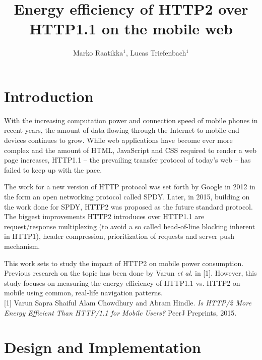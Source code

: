 \documentclass[noback]{cuposter}
\begin{document}
\newcommand{\don}{\ensuremath{d_{\textsc{ON}}}}
\newcommand{\doff}{\ensuremath{d_{\textsc{OFF}}}}
\newcommand{\dsoma}{\ensuremath{d_{\textsc{SOMA}}} \xspace}
\newcommand{\um}{\ensuremath{\mu \text{m}}\xspace}
\newcommand{\dmin}{d$_{\textup{min}}$\xspace}

\title{Energy efficiency of HTTP2 over HTTP1.1 on the mobile web}
\author{Marko Raatikka$^1$, Lucas Triefenbach$^1$}
\address{$^1$Aalto University School of Science, Espoo, Finland}

\makeposter

\section{Introduction}

With the increasing computation power and connection speed of mobile phones in recent years, the amount of data flowing through the Internet to mobile end devices continues to grow. While web applications have become ever more complex and the amount of HTML, JavaScript and CSS required to render a web page increases, HTTP1.1 -- the prevailing transfer protocol of today’s web -- has failed to keep up with the pace.

The work for a new version of HTTP protocol was set forth by Google in 2012 in the form an open networking protocol called SPDY. Later, in 2015, building on the work done for SPDY, HTTP2 was proposed as the future standard protocol. The biggest improvements HTTP2 introduces over HTTP1.1 are request/response multiplexing (to avoid a so called head-of-line blocking inherent in HTTP1), header compression, prioritization of requests and server push mechanism.

This work sets to study the impact of HTTP2 on mobile power consumption. Previous research on the topic has been done by Varun \emph{et al.} in [1]. However, this study focuses on measuring the energy efficiency of HTTP1.1 vs. HTTP2 on mobile using common, real-life navigation patterns.\\

\footnotesize{[1] Varun Sapra Shaiful Alam Chowdhury and Abram Hindle. \emph{Is HTTP/2 More Energy Efficient Than HTTP/1.1 for Mobile Users?} PeerJ Preprints, 2015.}

\vspace{-10mm}
\normalsize{}
\section{Design and Implementation}
\end{document}
